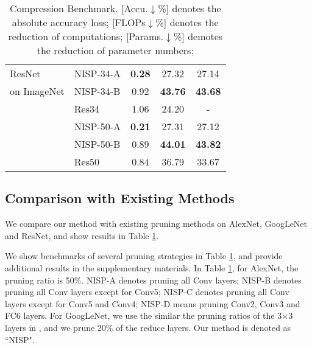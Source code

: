 \documentclass[10pt,twocolumn,letterpaper]{article}
\begin{document}
\begin{table}[h]
\begin{tabular}{@{}llccc@{}}
                        
\multirow{1}{*}{ResNet} & \multirow{1}{*}{NISP-34-A}  & \multirow{1}{*}{\textbf{0.28}}    &  \multirow{1}{*}{27.32}    & \multirow{1}{*}{27.14}           \\
\multirow{1}{*}{on ImageNet} & \multirow{1}{*}{NISP-34-B}  & \multirow{1}{*}{0.92}    &  \multirow{1}{*}{\textbf{43.76}}    & \multirow{1}{*}{\textbf{43.68}}      
\\ 
& \multirow{1}{*}{Res34 \cite{pruneweigth}}  & \multirow{1}{*}{1.06}    &  \multirow{1}{*}{24.20}    & \multirow{1}{*}{-}       
\\\cmidrule{2-5}

 & \multirow{1}{*}{NISP-50-A}  & \multirow{1}{*}{\textbf{0.21}}    &  \multirow{1}{*}{27.31}    & \multirow{1}{*}{27.12}          \\
& \multirow{1}{*}{NISP-50-B}  & \multirow{1}{*}{0.89}    &  \multirow{1}{*}{\textbf{44.01}}    & \multirow{1}{*}{\textbf{43.82}}        \\

& \multirow{1}{*}{Res50 \cite{thinet}}  & \multirow{1}{*}{0.84}    &  \multirow{1}{*}{36.79}    & \multirow{1}{*}{33.67}      
\\


                        \bottomrule
\end{tabular}
\caption{Compression Benchmark. [Accu.$\downarrow$\%] denotes the absolute accuracy loss; [FLOPs$\downarrow$\%] denotes the reduction of computations; [Params.$\downarrow$\%] demotes the reduction of parameter numbers; }
\label{table:others}
\vspace{3pt}
\end{table}\subsection{Comparison with Existing Methods}\label{existing}
We compare our method with existing pruning methods on AlexNet, GoogLeNet and ResNet, and show results in Table \ref{table:others}.

We show benchmarks of several pruning strategies in Table \ref{table:others}, and provide additional results in the supplementary materials.
In Table \ref{table:others}, for AlexNet, the pruning ratio is 50\%. NISP-A denotes pruning all Conv layers; NISP-B denotes pruning all Conv layers except for Conv5; NISP-C denotes pruning all Conv layers except for Conv5 and Conv4; NISP-D means pruning Conv2, Conv3 and FC6 layers.
For GoogLeNet, we use the similar the pruning ratios of the 3$\times$3 layers in \cite{Tucker}, and we prune 20\% of the
reduce layers. Our method is denoted as ``NISP".
\end{document}
